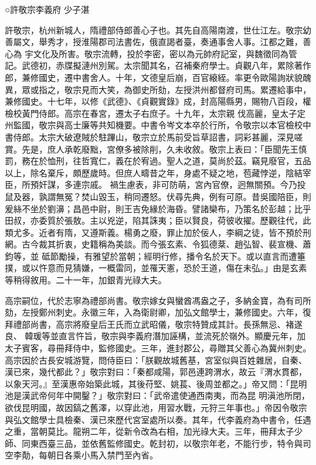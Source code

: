 
\begin{pinyinscope}

 ○許敬宗李義府
 少子湛



 許敬宗，杭州新城人，隋禮部侍郎善心子也。其先自高陽南渡，世仕江左。敬宗幼善屬文，舉秀才，授淮陽郡司法書佐，俄直謁者臺，奏通事舍人事。江都之難，善心為
 宇文化及所害。敬宗流轉，投於李密，密以為元帥府記室，與魏徵同為管記。武德初，赤牒擬漣州別駕。太宗聞其名，召補秦府學士。貞觀八年，累除著作郎，兼修國史，遷中書舍人。十年，文德皇后崩，百官縗絰。率更令歐陽詢狀貌醜異，眾或指之，敬宗見而大笑，為御史所劾，左授洪州都督府司馬。累遷給事中，兼修國史。十七年，以修《武德》、《貞觀實錄》成，封高陽縣男，賜物八百段，權檢校黃門侍郎。高宗在春宮，遷太子右庶子。十九年，太宗親
 伐高麗，皇太子定州監國，敬宗與高士廉等共知機要。中書令岑文本卒於行所，令敬宗以本官檢校中書侍郎。太宗大破遼賊於駐蹕山，敬宗立於馬前受旨草詔書，詞彩甚麗，深見嗟賞。先是，庶人承乾廢黜，宮僚多被除削，久未收敘。敬宗上表曰：「臣聞先王慎罰，務在於恤刑，往哲寬仁，義在於宥過。聖人之道，莫尚於茲。竊見廢官，五品以上，除名棄斥，頗歷歲時。但庶人疇昔之年，身處不疑之地，苞藏悖逆，陰結宰臣，所預奸謀，多連宗戚。
 禍生慮表，非可防萌，宮內官僚，迥無關預。今乃投鼠及器，孰謂無冤？焚山毀玉，稍同遷怒。伏尋先典，例有可原。昔吳國陪臣，則爰絲不坐於劉濞；昌邑中尉，則王吉免緣於海昏。譬諸欒布，乃策名於彭越；比乎田叔，亦委質於張敖。主以兇逆，陷其誅夷；臣以賢良，荷彼收擢。歷觀往代，此類尤多。近者有隋，又遵斯義。楊勇之廢，罪止加於佞人，李綱之徒，皆不預於刑網。古今裁其折衷，史籍稱為美談。而今張玄素、令狐德棻、趙弘智、裴宣機、蕭鈞等，並
 砥節勵操，有雅望於當朝；經明行修，播令名於天下。或以直言而遭箠撲，或以忤意而見猜嫌，一概雷同，並罹天憲，恐於王道，傷在未弘。」由是玄素等稍得敘用。二十一年，加銀青光祿大夫。



 高宗嗣位，代於志寧為禮部尚書。敬宗嫁女與蠻酋馮盎之子，多納金寶，為有司所劾，左授鄭州刺史。永徽三年，入為衛尉卿，加弘文館學士，兼修國史。六年，復拜禮部尚書，高宗將廢皇后王氏而立武昭儀，敬宗特贊成其計。長孫無忌、褚遂良、
 韓瑗等並直言忤旨，敬宗與李義府潛加誣構，並流死於嶺外。顯慶元年，加太子賓客，尋冊拜侍中，監修國史。三年，進封郡公，尋贈其父善心為冀州刺史。高宗因於古長安城游覽，問侍臣曰：「朕觀故城舊基，宮室似與百姓雜居，自秦、漢已來，幾代都此？」敬宗對曰：「秦都咸陽，郭邑連跨渭水，故云『渭水貫都，以象天河。』至漢惠帝始築此城，其後苻堅、姚萇、後周並都之。」帝又問：「昆明池是漢武帝何年中開鑿？」敬宗對曰：「武帝遣使通西南夷，而為昆
 明滇池所閉，欲伐昆明國，故因鎬之舊澤，以穿此池，用習水戰，元狩三年事也。」帝因令敬宗與弘文館學士具檢秦、漢已來歷代宮室處所以奏。其年，代李義府為中書令，任遇之重，當朝莫比。龍朔二年，從新令改為右相，加光祿大夫。三年，冊拜太子少師、同東西臺三品，並依舊監修國史。乾封初，以敬宗年老，不能行步，特令與司空李勣，每朝日各乘小馬入禁門至內省。




\end{pinyinscope}
